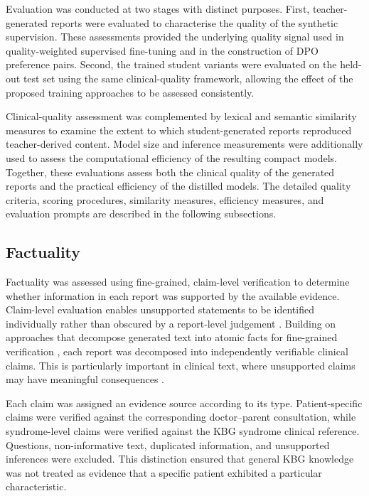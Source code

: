 \documentclass[ %
                    author={Aman Kumar Singh},
                supervisor={Dr. Edwin Simpson},
                    degree={MSc},
                     title={Quality-Aware Knowledge Distillation of Large Language Models for Efficient Personalised Clinical Report Generation},
                  subtitle={},
                      type={},
                      year={2021}]{dissertation}
\begin{document}
Evaluation was conducted at two stages with distinct purposes. First,
teacher-generated reports were evaluated to characterise the quality of the
synthetic supervision. These assessments provided the underlying quality
signal used in quality-weighted supervised fine-tuning and in the
construction of DPO preference pairs. Second, the trained student variants
were evaluated on the held-out test set using the same clinical-quality
framework, allowing the effect of the proposed training approaches to be
assessed consistently.

Clinical-quality assessment was complemented by lexical and semantic
similarity measures to examine the extent to which student-generated
reports reproduced teacher-derived content. Model size and inference
measurements were additionally used to assess the computational efficiency
of the resulting compact models. Together, these evaluations assess both
the clinical quality of the generated reports and the practical efficiency
of the distilled models. The detailed quality criteria, scoring procedures,
similarity measures, efficiency measures, and evaluation prompts are
described in the following subsections.
\subsection{Factuality}
\label{sec:factuality}

Factuality was assessed using fine-grained, claim-level verification to
determine whether information in each report was supported by the available
evidence. Claim-level evaluation enables unsupported statements to be
identified individually rather than obscured by a report-level judgement
\cite{min_factscore_2023,scire_fenice_2024}. Building on approaches that
decompose generated text into atomic facts for fine-grained verification
\cite{kim_atomic_2026}, each report was decomposed into independently
verifiable clinical claims. This is particularly important in clinical text,
where unsupported claims may have meaningful consequences
\cite{bn_fact-controlled_2025,munnangi_factehr_2025}.

Each claim was assigned an evidence source according to its type.
Patient-specific claims were verified against the corresponding
doctor--parent consultation, while syndrome-level claims were verified
against the KBG syndrome clinical reference. Questions, non-informative
text, duplicated information, and unsupported inferences were excluded.
This distinction ensured that general KBG knowledge was not treated as
evidence that a specific patient exhibited a particular characteristic.
\end{document}
